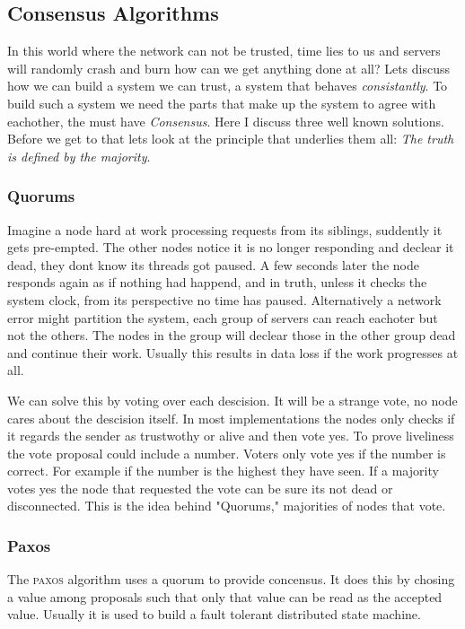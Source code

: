 \subsection{Consensus Algorithms}
In this world where the network can not be trusted, time lies to us and servers will randomly crash and burn how can we get anything done at all? Lets discuss how we can build a system we can trust, a system that behaves \textit{consistantly}. To build such a system we need the parts that make up the system to agree with eachother, the must have \emph{Consensus}. Here I discuss three well known solutions. Before we get to that lets look at the principle that underlies them all: \emph{The truth is defined by the majority}.

\subsubsection*{Quorums}
Imagine a node hard at work processing requests from its siblings, suddently it gets pre-empted. The other nodes notice it is no longer responding and declear it dead, they dont know its threads got paused. A few seconds later the node responds again as if nothing had happend, and in truth, unless it checks the system clock, from its perspective no time has paused. Alternatively a network error might partition the system, each group of servers can reach eachoter but not the others. The nodes in the group will declear those in the other group dead and continue their work. Usually this results in data loss if the work progresses at all.

We can solve this by voting over each descision. It will be a strange vote, no node cares about the descision itself. In most implementations the nodes only checks if it regards the sender as trustwothy or alive and then vote yes. To prove liveliness the vote proposal could include a number. Voters only vote yes if the number is correct. For example if the number is the highest they have seen. If a majority votes yes the node that requested the vote can be sure its not dead or disconnected. This is the idea behind "Quorums," majorities of nodes that vote.

\subsubsection*{Paxos}
The \textsc{paxos} algorithm\cite{paxos} uses a quorum to provide concensus. It does this by chosing a value among proposals such that only that value can be read as the accepted value. Usually it is used to build a fault tolerant distributed state machine. 

